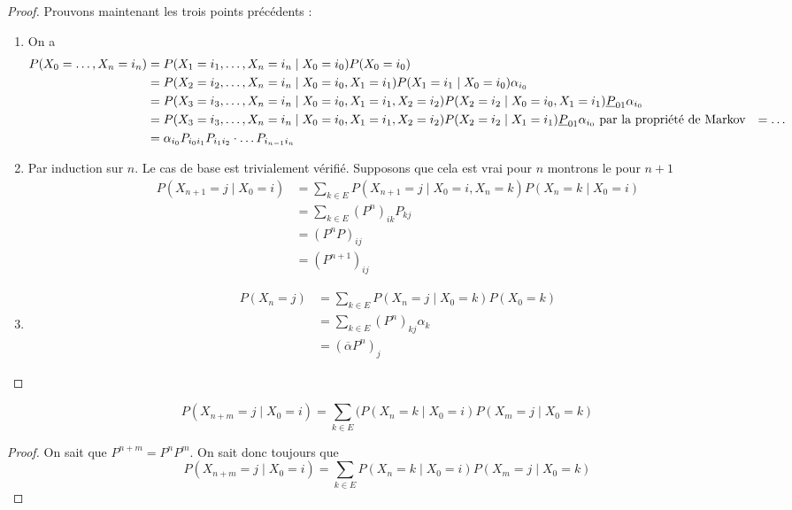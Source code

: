 \begin{proof}
    Prouvons maintenant les trois points précédents : 
    \begin{enumerate}
        \item On a  
        \begin{align*}
           P(X_0 = \dotsc, X_n = i_n) &= P( X_1 = i_1,\dotsc, X_n = i_n\mid X_0 = i_0)P(X_0 = i_0)\\
           &=  P(X_2 = i_2,\dots, X_n = i_n\mid X_0 = i_0, X_1 = i_1)P(X_1 = i_1\mid X_0 = i_0) \alpha_{i_0}\\
           &=  P(X_3 = i_3,\dots, X_n = i_n\mid X_0 = i_0, X_1 = i_1,X_2 = i_2)P(X_2 = i_2\mid X_0 = i_0, X_1 = i_1) \underline{P}_{01}\alpha_{i_0}\\
           &= P(X_3 = i_3,\dots, X_n = i_n\mid X_0 = i_0, X_1 = i_1,X_2 = i_2)P(X_2 = i_2\mid  X_1 = i_1) \underline{P}_{01}\alpha_{i_0} \text{ par la propriété de Markov}
           &= \dots\\ 
        &=\alpha_{i_0}P_{i_0i_1}P_{i_1i_2}\cdot\dots P_{i_{n-1}i_n}
        \end{align*}
        \item Par induction sur $n$. Le cas de base est trivialement vérifié. Supposons que cela est vrai pour $n$ montrons le pour $n+1$
        \begin{align*}
        P(X_{n+1}=j \mid X_0= i)&=\sum_{k\in E}P(X_{n+1}=j\mid X_0=i, X_n=k)P(X_n= k\mid X_0= i)\\
        & = \sum _{k\in E}(P^n)_{ik}P_{kj}\\
        &=(P^n P)_{ij}
        \\ &= (P^{n+1})_{ij}
        \end{align*}
        \item 
        \begin{align*}
            P(X_n = j)&= \sum_{k\in E}P(X_n = j\mid X_0= k)P(X_0= k)\\ &= \sum _{k\in E} (P^{n})_{kj}\alpha_k\\
            &= (\overline{\alpha}P^n)_j
        \end{align*}
    \end{enumerate}
\end{proof}
\begin{proposition}
    $$P(X_{n+m} = j\mid X_0 = i) = \sum_{k\in E}(P(X_n = k\mid X_0 = i)P(X_m = j\mid X_0 = k)$$
\end{proposition}
\begin{proof}
    

On sait que $P^{n+m}= P^nP ^m$. On sait donc toujours que 
$$P(X_{n+m}= j \mid X_0 = i)= \sum_{k\in E}P(X_n= k\mid X_0= i)P(X_m= j \mid X_0= k)$$
\end{proof}

